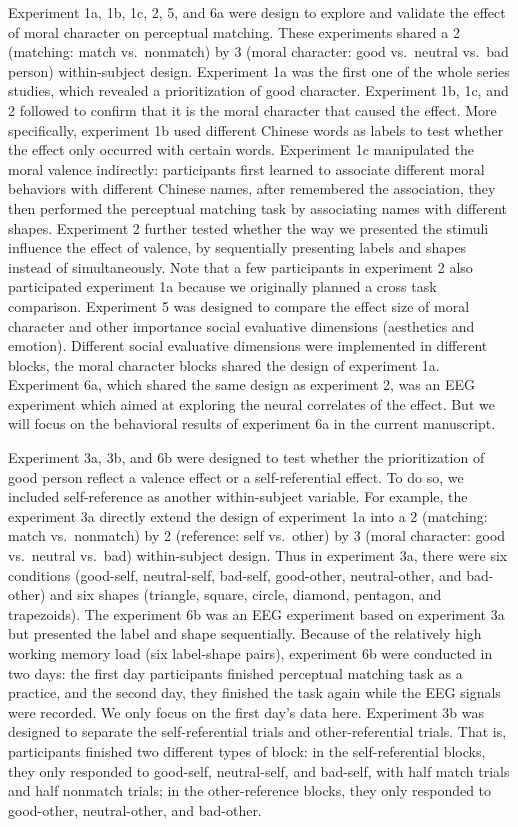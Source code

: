 \documentclass[
  man]{apa6}
\begin{document}
Experiment 1a, 1b, 1c, 2, 5, and 6a were design to explore and validate the effect of moral character on perceptual matching. These experiments shared a 2 (matching: match vs.~nonmatch) by 3 (moral character: good vs.~neutral vs.~bad person) within-subject design. Experiment 1a was the first one of the whole series studies, which revealed a prioritization of good character. Experiment 1b, 1c, and 2 followed to confirm that it is the moral character that caused the effect. More specifically, experiment 1b used different Chinese words as labels to test whether the effect only occurred with certain words. Experiment 1c manipulated the moral valence indirectly: participants first learned to associate different moral behaviors with different Chinese names, after remembered the association, they then performed the perceptual matching task by associating names with different shapes. Experiment 2 further tested whether the way we presented the stimuli influence the effect of valence, by sequentially presenting labels and shapes instead of simultaneously. Note that a few participants in experiment 2 also participated experiment 1a because we originally planned a cross task comparison. Experiment 5 was designed to compare the effect size of moral character and other importance social evaluative dimensions (aesthetics and emotion). Different social evaluative dimensions were implemented in different blocks, the moral character blocks shared the design of experiment 1a. Experiment 6a, which shared the same design as experiment 2, was an EEG experiment which aimed at exploring the neural correlates of the effect. But we will focus on the behavioral results of experiment 6a in the current manuscript.

Experiment 3a, 3b, and 6b were designed to test whether the prioritization of good person reflect a valence effect or a self-referential effect. To do so, we included self-reference as another within-subject variable. For example, the experiment 3a directly extend the design of experiment 1a into a 2 (matching: match vs.~nonmatch) by 2 (reference: self vs.~other) by 3 (moral character: good vs.~neutral vs.~bad) within-subject design. Thus in experiment 3a, there were six conditions (good-self, neutral-self, bad-self, good-other, neutral-other, and bad-other) and six shapes (triangle, square, circle, diamond, pentagon, and trapezoids). The experiment 6b was an EEG experiment based on experiment 3a but presented the label and shape sequentially. Because of the relatively high working memory load (six label-shape pairs), experiment 6b were conducted in two days: the first day participants finished perceptual matching task as a practice, and the second day, they finished the task again while the EEG signals were recorded. We only focus on the first day's data here. Experiment 3b was designed to separate the self-referential trials and other-referential trials. That is, participants finished two different types of block: in the self-referential blocks, they only responded to good-self, neutral-self, and bad-self, with half match trials and half nonmatch trials; in the other-reference blocks, they only responded to good-other, neutral-other, and bad-other.
\end{document}
